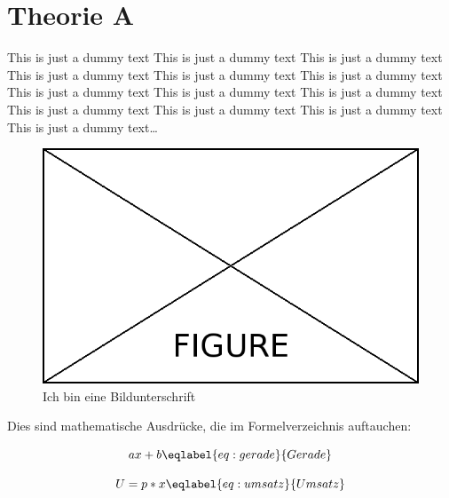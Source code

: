 \section{Theorie A}
\label{sec:theorieA}

This is just a dummy text This is just a dummy text This is just a dummy text This is just a dummy text This is just a dummy text This is just a dummy text This is just a dummy text This is just a dummy text This is just a dummy text This is just a dummy text This is just a dummy text This is just a dummy text This is just a dummy text\dots

\bigskip
\begin{figure}[H]
	\centering
	\includegraphics[width=\textwidth]{Content/Figures/figure.png}
	\caption{Ich bin eine Bildunterschrift}
	\label{fig:test}
\end{figure}

Dies sind mathematische Ausdrücke, die im Formelverzeichnis auftauchen:

\begin{equation}
ax + b
\eqlabel{eq:gerade}{Gerade}
\end{equation}

\begin{equation}
U = p * x
\eqlabel{eq:umsatz}{Umsatz}
\end{equation}
